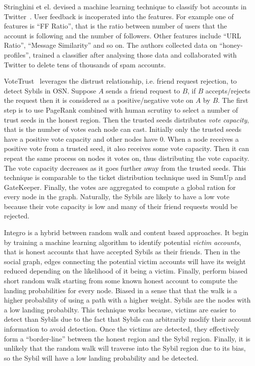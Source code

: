 Stringhini et el. devised a machine learning technique to classify bot accounts
in Twitter~\cite{stringhini2010detecting}. User feedback is incoperated into the
features. For example one of features is ``FF Ratio'', that is the ratio between
number of users that the account is following and the number of followers. Other
features include ``URL Ratio'', ``Message Similarity'' and so on. The authors
collected data on ``honey-profiles'', trained a classifier after analysing those
data and collaborated with Twitter to delete tens of thousands of spam accounts.

VoteTrust~\cite{xue2013votetrust} leverages the distrust relationship, i.e.
friend request rejection, to detect Sybils in OSN. Suppose $A$ sends a friend
request to $B$, if $B$ accepts/rejects the request then it is considered as a
positive/negative vote on $A$ by $B$. The first step is to use PageRank combined
with human scrutiny to select a number of trust seeds in the honest region. Then
the trusted seeds distributes \emph{vote capacity}, that is the number of votes
each node can cast. Initially only the trusted seeds have a positive vote
capacity and other nodes have 0. When a node receives a positive vote from a
trusted seed, it also receives some vote capacity. Then it can repeat the same
process on nodes it votes on, thus distributing the vote capacity. The vote
capacity decreases as it goes further away from the trusted seeds. This
technique is comparable to the ticket distribution technique used in SumUp and
GateKeeper. Finally, the votes are aggregated to compute a global ration for
every node in the graph. Naturally, the Sybils are likely to have a low vote
because their vote capacity is low and many of their friend requests would be
rejected.

Integro\cite{boshmaf2015integro} is a hybrid between random walk and content
based approaches. It begin by training a machine learning algorithm to identify
potential \emph{victim accounts}, that is honest accounts that have accepted
Sybils as their friends. Then in the social graph, edges connecting the
potential victim accounts will have its weight reduced depending on the
likelihood of it being a victim. Finally, perform biased short random walk
starting from some known honest account to compute the landing probabilities for
every node. Biased in a sense that that the walk is a higher probability of
using a path with a higher weight. Sybils are the nodes with a low landing
probabilty. This technique works because, victims are easier to detect than
Sybils due to the fact that Sybils can arbitrarily modify their account
information to avoid detection. Once the victims are detected, they effectively
form a ``border-line'' between the honest region and the Sybil region. Finally,
it is unlikely that the random walk will traverse into the Sybil region due to
its bias, so the Sybil will have a low landing probability and be detected.


